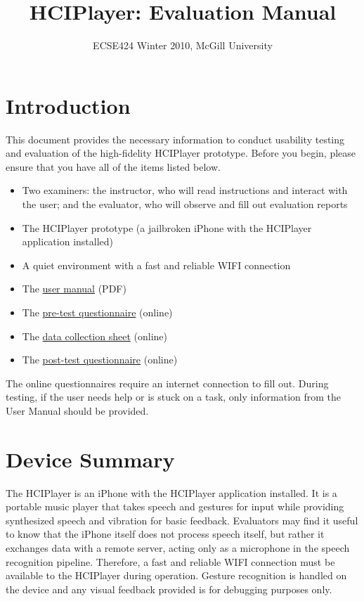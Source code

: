 \documentclass[12pt,letterpaper]{article}
\begin{document}
\title{HCIPlayer: Evaluation Manual}
\author{ECSE424 Winter 2010, McGill University}
\renewcommand{\today}{Updated: Monday, March 8th, 2010}
\maketitle

\section{Introduction}

This document provides the necessary information to conduct usability testing and evaluation of the high-fidelity HCIPlayer prototype. Before you begin, please ensure that you have all of the items listed below.

\begin{itemize}
\item Two examiners: the instructor, who will read instructions and interact with the user; and the evaluator, who will observe and fill out evaluation reports
\item The HCIPlayer prototype (a jailbroken iPhone with the HCIPlayer application installed)
\item A quiet environment with a fast and reliable WIFI connection
\item The \href{http://www.ece.mcgill.ca/~scormi3/hci/docs/user-manual.pdf}{user manual} (PDF)
\item The \href{http://fluidsurveys.com/s/hciplayer-pretest/}{pre-test questionnaire} (online)
\item The \href{http://fluidsurveys.com/s/hciplayer-datacollectionsheet/}{data collection sheet} (online)
\item The \href{http://fluidsurveys.com/s/hciplayer-posttest/}{post-test questionnaire} (online)
\end{itemize}

The online questionnaires require an internet connection to fill out. During testing, if the user needs help or is stuck on a task, only information from the User Manual should be provided.

\section{Device Summary}

The HCIPlayer is an iPhone with the HCIPlayer application installed. It is a portable music player that takes speech and gestures for input while providing synthesized speech and vibration for basic feedback. Evaluators may find it useful to know that the iPhone itself does not process speech itself, but rather it exchanges data with a remote server, acting only as a microphone in the speech recognition pipeline. Therefore, a fast and reliable WIFI connection must be available to the HCIPlayer during operation. Gesture recognition is handled on the device and any visual feedback provided is for debugging purposes only. 
\end{document}
